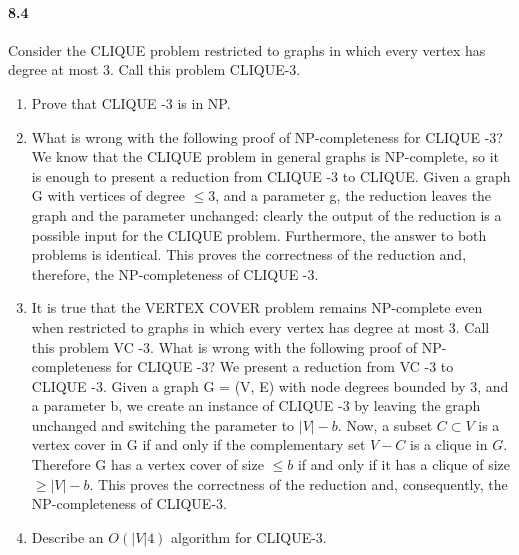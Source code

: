 \documentclass[12pt]{article}
\newcommand{\BigO}[1]{\ensuremath{O(#1)}}
\begin{document}
\paragraph{8.4}
Consider the CLIQUE problem restricted to graphs in which every vertex has degree at most 3.
Call this problem CLIQUE-3.
\begin{enumerate}
\item Prove that CLIQUE -3 is in NP.
\item What is wrong with the following proof of NP-completeness for CLIQUE -3?
        We know that the CLIQUE problem in general graphs is NP-complete, so it is enough to
        present a reduction from CLIQUE -3 to CLIQUE. Given a graph G with
        vertices of degree $\le 3$, and a parameter g, the reduction
        leaves the graph and the parameter unchanged: clearly the output
        of the reduction is a possible input for the CLIQUE problem.
        Furthermore, the answer to both problems is identical. This
        proves the correctness of the reduction and, therefore, the
        NP-completeness of CLIQUE -3.
\item It is true that the VERTEX COVER problem remains NP-complete even when restricted to
    graphs in which every vertex has degree at most 3. Call this problem
    VC -3. What is wrong with the following proof of NP-completeness for
    CLIQUE -3?  We present a reduction from VC -3 to CLIQUE -3. Given a
    graph G = (V, E) with node degrees bounded by 3, and a parameter b,
    we create an instance of CLIQUE -3 by leaving the graph unchanged
    and switching the parameter to $|V| - b$. Now, a subset $C \subset
    V$ is a vertex cover in G if and only if the complementary set $V -
    C$ is a clique in $G$. Therefore G has a vertex cover of size $\le
    b$ if and only if it has a clique of size $\ge |V| - b$. This proves
    the correctness of the reduction and, consequently, the
    NP-completeness of CLIQUE-3.
\item Describe an $\BigO{|V|4}$ algorithm for CLIQUE-3.
\end{enumerate}
\end{document}
